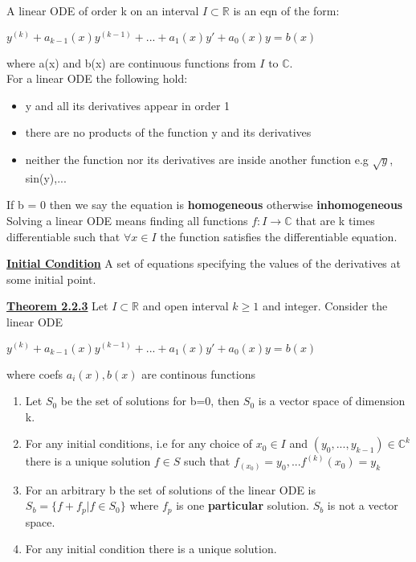 \documentclass[8pt]{extreport}
\begin{document}
A linear ODE of order k on an interval $I \subset \mathbb{R}$ is an eqn of the form:
\begin{center}
$y^{(k)} + a_{k-1}(x)y^{(k-1)} + ... + a_1(x)y' + a_0(x)y = b(x)$
\end{center}
where a(x) and b(x) are continuous functions from $I \text{ to } \mathbb{C}$.\\
For a linear ODE the following hold:
\begin{itemize}
\item y and all its derivatives appear in order 1
\item there are no products of the function y  and its derivatives
\item neither the function nor its derivatives are inside another function e.g $\sqrt{y}$, sin(y),...
\end{itemize}
If b = 0 then we say the equation is \textbf{homogeneous} otherwise \textbf{inhomogeneous}\\


Solving a linear ODE means finding all functions $f:I \rightarrow \mathbb{C}$ that are k times differentiable such that $\forall x \in  I$ the function satisfies the differentiable equation.

\textbf{\underline{Initial Condition}} A set of equations specifying the values of the derivatives at some initial point. 

\underline{\textbf{Theorem 2.2.3}} Let $I\subset \mathbb{R}$ and open interval $k\geq 1$ and integer. Consider the linear ODE
\begin{center}
$y^{(k)} + a_{k-1}(x)y^{(k-1)} + ... + a_1(x)y' + a_0(x)y = b(x)$
\end{center}
where coefs $a_i(x), b(x)$ are continous functions
\begin{enumerate}
\item Let $S_0$ be the set of solutions for b=0, then $S_0$ is a vector space of dimension k.
\item For any initial conditions, i.e for any choice of $x_0 \in I$ and $(y_0,...,y_{k-1}) \in \mathbb{C}^k$ there is a unique solution $f \in S$ such that $f_(x_0) = y_0, ... f^{(k)}(x_0)= y_k$
\item For an arbitrary b the set of solutions of the linear ODE is $S_b = \{f + f_p | f \in S_0\}$ where $f_p$ is one \textbf{particular} solution. $S_b$ is not a vector space. 
\item For any initial condition there is a unique solution.
  
\end{enumerate}
\end{document}
